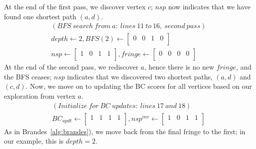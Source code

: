 %
At the end of the first pass, we discover vertex $c$; $nsp$ now indicates that
we have found one shortest path $(a,d)$.
%
\begin{align*}
(BFS\ search\ from\ a:\ lines\ 11\ to\ 16,\ second\ pass) \\
depth\leftarrow{}2,
BFS(2)\leftarrow{}\left[\begin{array}{cccc}0 & 0 & 1 & 0 \\\end{array} \right]\\
nsp\leftarrow{}\left[\begin{array}{cccc}1 & 0 & 1 & 1 \\\end{array} \right],
fringe\leftarrow{}\left[\begin{array}{cccc}0 & 0 & 0 & 0 \\\end{array} \right]
\end{align*}
%
At the end of the second pass, we rediscover $a$, hence there is no new
$fringe$, and the BFS ceases; $nsp$ indicates that we discovered two shortest
paths, $(a,d)$ and $(c,d)$.
%
Now, we move on to updating the BC scores for all vertices based on our
exploration from vertex $a$.
%
\begin{align*}
(Initialize\ for\ BC\ updates:\ lines\ 17\ and \ 18) \\
BC_{updt}\leftarrow{}\left[\begin{array}{cccc}1 & 1 & 1 & 1 \\\end{array} \right],
nsp^{inv}\leftarrow{}\left[\begin{array}{cccc}1 & 0 & 1 & 1 \\\end{array} \right]
\end{align*}
%
As in Brandes~\ref{alg:brandes}), we move back from the final fringe to the 
first; in our example, this is $depth=2$.
%
